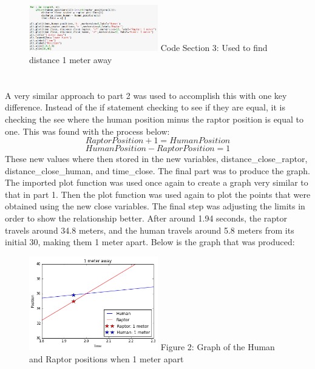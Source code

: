\documentclass[twocolumn]{revtex4}
\begin{document}
\begin{figure}[h!]
\includegraphics[width=0.5\textwidth]{Code3.png}
Code Section 3: Used to find distance 1 meter away 

\end{figure} 	
\section*{}
 A very similar approach
	to part 2 was used to accomplish this with one key difference. Instead of the if statement
	checking to see if they are equal, it is checking the see where the human position minus 
	the raptor position is equal to one. This was found with the process below:
	$$Raptor Position + 1 = Human Position$$
	$$Human Position - Raptor Position = 1$$
	These new values where then stored in the new variables, distance\_close\_raptor,
	distance\_close\_human, and time\_close. The final part was to produce the graph. The 
	imported plot function was used once again to create a graph very similar to that in
	part 1. Then the plot function was used again to plot the points that were obtained using
	the new close variables. The final step was adjusting the limits in order to show the
	relationship better. After around 1.94 seconds, the raptor travels around 34.8 meters, and the human travels around 5.8 meters from its initial 30, making them 1 meter apart. Below is the graph that was produced:
	
\begin{figure}[h!]
\includegraphics[width=0.5\textwidth]{Figure3.png}
Figure 2: Graph of the Human and Raptor positions when 1 meter apart

\end{figure} 
\end{document}
